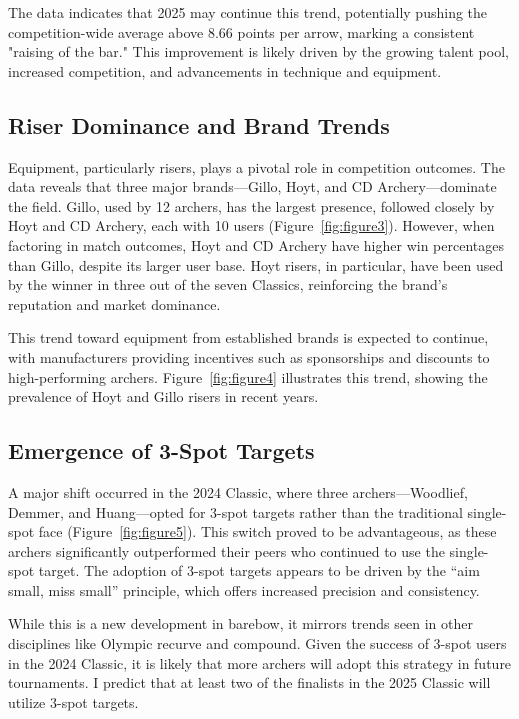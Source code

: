 \documentclass{article}
\begin{document}
The data indicates that 2025 may continue this trend, potentially pushing the competition-wide average above 8.66 points per arrow, marking a consistent "raising of the bar." This improvement is likely driven by the growing talent pool, increased competition, and advancements in technique and equipment.

\subsection{Riser Dominance and Brand Trends}
Equipment, particularly risers, plays a pivotal role in competition outcomes. The data reveals that three major brands—Gillo, Hoyt, and CD Archery—dominate the field. Gillo, used by 12 archers, has the largest presence, followed closely by Hoyt and CD Archery, each with 10 users (Figure~\ref{fig:figure3}). However, when factoring in match outcomes, Hoyt and CD Archery have higher win percentages than Gillo, despite its larger user base. Hoyt risers, in particular, have been used by the winner in three out of the seven Classics, reinforcing the brand’s reputation and market dominance.

This trend toward equipment from established brands is expected to continue, with manufacturers providing incentives such as sponsorships and discounts to high-performing archers. Figure~\ref{fig:figure4} illustrates this trend, showing the prevalence of Hoyt and Gillo risers in recent years.

\subsection{Emergence of 3-Spot Targets}
A major shift occurred in the 2024 Classic, where three archers—Woodlief, Demmer, and Huang—opted for 3-spot targets rather than the traditional single-spot face (Figure~\ref{fig:figure5}). This switch proved to be advantageous, as these archers significantly outperformed their peers who continued to use the single-spot target. The adoption of 3-spot targets appears to be driven by the “aim small, miss small” principle, which offers increased precision and consistency.

While this is a new development in barebow, it mirrors trends seen in other disciplines like Olympic recurve and compound. Given the success of 3-spot users in the 2024 Classic, it is likely that more archers will adopt this strategy in future tournaments. I predict that at least two of the finalists in the 2025 Classic will utilize 3-spot targets.
\end{document}
